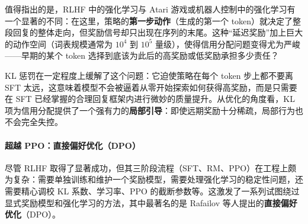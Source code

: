 \begin{framed}{}
    值得指出的是，RLHF 中的强化学习与 Atari 游戏或机器人控制中的强化学习有一个显著的不同：在这里，策略的\textbf{第一步动作}（生成的第一个 token）就决定了整段回复的整体走向，但奖励信号却只出现在序列的末尾。这种“延迟奖励”加上巨大的动作空间（词表规模通常为 $10^4$ 到 $10^5$ 量级），使得信用分配问题变得尤为严峻——早期的某个 token 选择到底该为此后的高奖励或低奖励承担多少责任？

    KL 惩罚在一定程度上缓解了这个问题：它迫使策略在每个 token 步上都不要离 SFT 太远，这意味着模型不会被逼着从零开始探索如何获得高奖励，而是只需要在 SFT 已经掌握的合理回复框架内进行微妙的质量提升。从优化的角度看，KL 项为信用分配提供了一个强有力的\textbf{局部引导}：即使远期奖励十分稀疏，局部行为也不会完全失控。
\end{framed}

\paragraph{超越 PPO：直接偏好优化（DPO）}

尽管 RLHF 取得了显著成功，但其三阶段流程（SFT、RM、PPO）在工程上颇为复杂：需要单独训练和维护一个奖励模型，需要处理强化学习的稳定性问题，还需要精心调校 KL 系数、学习率、PPO 的截断参数等。这激发了一系列试图绕过显式奖励模型和强化学习的方法，其中最著名的是 Rafailov 等人提出的\textbf{直接偏好优化}（DPO）。

